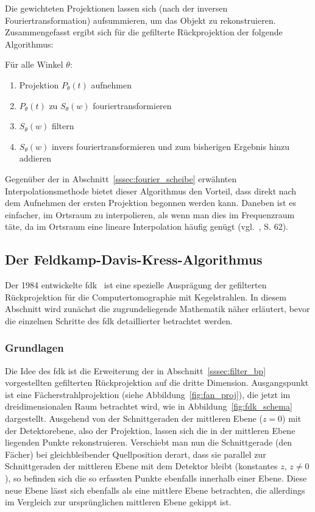 Die gewichteten Projektionen lassen sich (nach der inversen Fouriertransformation) aufsummieren, um das Objekt zu
rekonstruieren. Zusammengefasst ergibt sich für die gefilterte Rückprojektion der folgende Algorithmus:

Für alle Winkel $\theta$:
\begin{enumerate}
    \item Projektion $P_{\theta}(t)$ aufnehmen
    \item $P_{\theta}(t)$ zu $S_{\theta}(w)$ fouriertransformieren
    \item $S_{\theta}(w)$ filtern
    \item $S_{\theta}(w)$ invers fouriertransformieren und zum bisherigen Ergebnis hinzu addieren
\end{enumerate}

Gegenüber der in Abschnitt~\ref{sssec:fourier_scheibe} erwähnten Interpolationsmethode bietet dieser Algorithmus den
Vorteil, dass direkt nach dem Aufnehmen der ersten Projektion begonnen werden kann. Daneben ist es einfacher, im
Ortsraum zu interpolieren, als wenn man dies im Frequenzraum täte, da im Ortsraum eine lineare Interpolation häufig
genügt (vgl.~\cite{kakslan}, S. 62).

\subsection{Der Feldkamp-Davis-Kress-Algorithmus}\label{ssec:fdk}

Der 1984 entwickelte \gls{fdk}~\cite{fdk} ist eine spezielle Ausprägung der gefilterten Rückprojektion für die
Computertomographie mit Kegelstrahlen. In diesem Abschnitt wird zunächst die zugrundeliegende Mathematik näher
erläutert, bevor die einzelnen Schritte des \gls{fdk} detaillierter betrachtet werden.

\subsubsection{Grundlagen}\label{sssec:fdk_math}

Die Idee des \gls{fdk} ist die Erweiterung der in Abschnitt~\ref{sssec:filter_bp} vorgestellten gefilterten
Rückprojektion auf die dritte Dimension. Ausgangspunkt ist eine Fächerstrahlprojektion (siehe
Abbildung~\ref{fig:fan_proj}), die jetzt im dreidimensionalen Raum betrachtet wird, wie in
Abbildung~\ref{fig:fdk_schema} dargestellt. Ausgehend von der Schnittgeraden der mittleren Ebene ($z = 0$) mit der
Detektorebene, also der Projektion, lassen sich die in der mittleren Ebene liegenden Punkte rekonstruieren. Verschiebt
man nun die Schnittgerade (den Fächer) bei gleichbleibender Quellposition derart, dass sie parallel zur Schnittgeraden
der mittleren Ebene mit dem Detektor bleibt (konstantes $z$, $z \neq 0$), so befinden sich die so erfassten Punkte
ebenfalls innerhalb einer Ebene. Diese neue Ebene lässt sich ebenfalls als eine mittlere Ebene betrachten, die
allerdings im Vergleich zur {\glqq}ursprünglichen{\grqq} mittleren Ebene gekippt ist.

